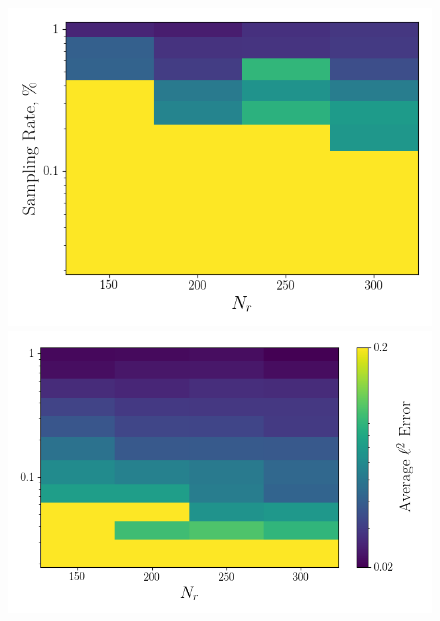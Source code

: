 \begin{figure}
	\begin{minipage}{0.46\linewidth}
		\includegraphics[width=0.99\linewidth]{Chapters/CavityAndCVRC/Images/cvrc/deim/err_contour_random_dt5e-7.png}
	\end{minipage}
	\begin{minipage}{0.53\linewidth}
		\includegraphics[width=0.99\linewidth]{Chapters/CavityAndCVRC/Images/cvrc/deim/err_contour_eigenvec_dt5e-7.png}
	\end{minipage}


\end{figure}
